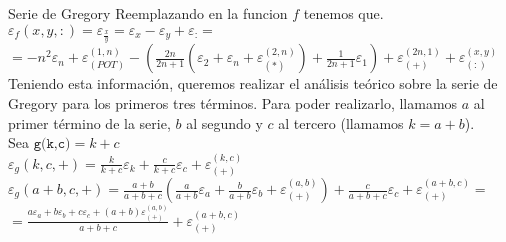 \documentclass[12pt,titlepage]{article}
\newcommand{\funcFull}[2]{\texttt{#1}=#2}
\newcommand{\e}[2]{\varepsilon _{#1}({#2})}
\newcommand{\er}[2]{\varepsilon _{({#1})}^{({#2})}}
\newcommand{\ev}[1]{\varepsilon _{#1}}
\begin{document}
\begin{section}{Serie de Gregory}
		Reemplazando en la funcion $f$ tenemos que.\\
		
		$\e{f}{x,y,:} = \ev{\frac{x}{y}} = \ev{x} - \ev{y} + \ev{:} =$\\
		
		$= -n^2\ev{n} + \er{POT}{1,n} - (\frac{2n}{2n+1}(\ev{2} + \ev{n} + \er{*}{2,n}) + \frac{1}{2n+1}\ev{1}) + \er{+}{2n,1} + \er{:}{x,y}$\\
		
		Teniendo esta información, queremos realizar el análisis teórico sobre la serie de Gregory para los primeros tres términos. Para poder realizarlo, llamamos $a$ al primer término de la serie,
		$b$ al segundo y $c$ al tercero (llamamos $k=a+b$).\\
		
		Sea $\funcFull{g(k,c)}{k+c}$\\
		
		$\e{g}{k,c,+} = \frac{k}{k+c}\ev{k} + \frac{c}{k+c}\ev{c} + \er{+}{k,c}$\\
		
		$\e{g}{a+b,c,+} = \frac{a+b}{a+b+c}(\frac{a}{a+b}\ev{a} + \frac{b}{a+b}\ev{b} + \er{+}{a,b}) + \frac{c}{a+b+c}\ev{c} + \er{+}{a+b,c} =$\\
		 
		$= \frac{a\ev{a} + b\ev{b} + c\ev{c} + (a+b)\er{+}{a,b}}{a+b+c} + \er{+}{a+b,c}$
	\end{section}
\end{document}
